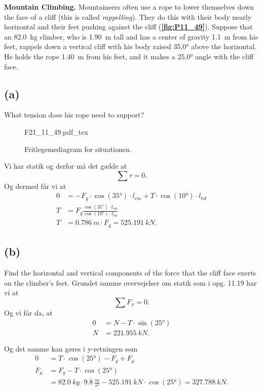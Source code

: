 \documentclass[12pt]{article}
\newcommand{\incfig}[2][1]{%
  \def\svgwidth{#1\columnwidth}
  {#2.pdf_tex}
}
\theoremstyle{definition}
\begin{document}
\textbf{Mountain Climbing.} Mountaineers often use a rope to lower themselves down the face of a cliff (this is called \textit{rappelling}). They do this with their body nearly horizontal and their feet pushing against the cliff (\textbf{\autoref{fig:P11_49}}). Suppose that an \qty{82,0}{kg} climber, who is \qty{1,90}{m} tall and has a center of gravity \qty{1,1}{m} from his feet, rappels down a vertical cliff with his body raised \ang{35,0} above the horizontal. He holds the rope \qty{1,40}{m} from his feet, and it makes a \ang{25,0} angle with the cliff face.

\subsection*{(a)}
What tension does his rope need to support?
\begin{figure}[ht]
  \centering
  \incfig[0.3]{F21_11_49}
  \caption{Fritlegemediagram for situationen.}
  \label{fig:F21_11_49}
\end{figure}

Vi har statik og derfor må det gælde at
\[ 
\sum \tau = 0
.\]
Og dermed får vi at
\begin{align*}
  0 &= -F_g \cdot \cos \left( \ang{35}  \right) \cdot l_{cm} + T \cdot \cos \left( \ang{10}  \right) \cdot l_{tot}  \\
  T &= F_g \frac{\cos \left( \ang{35}  \right) \cdot l_{cm}}{\cos \left( \ang{10} \right) \cdot l_{tot}} \\
  T &= \qty{0.786}{m} \cdot F_g = \qty{525.191}{kN} 
.\end{align*}



\subsection*{(b)}
Find the horizontal and vertical components of the force that the cliff face exerts on the climber’s feet.
\bigbreak
Grundet samme overvejelser om statik som i opg. 11.19 har vi at
\[ 
\sum F_x = 0
.\]
Og vi får da, at
\begin{align*}
  0 &= N - T \cdot \sin \left( \ang{25}  \right) \\
  N &= \qty{221,955}{kN} 
.\end{align*}

Og det samme kan gøres i y-retningen som
\begin{align*}
  0 &= T \cdot \cos \left( \ang{25} \right) - F_g + F_{\mu} \\
  F_{\mu} &= F_g - T \cdot \cos \left( \ang{25} \right) \\
  &= \qty{82,0}{kg} \cdot \qty{9,8}{\frac{m}{s^2}} - \qty{525,191}{kN} \cdot \cos (\ang{25}) = \qty{327,788}{kN} 
.\end{align*}
\end{document}
